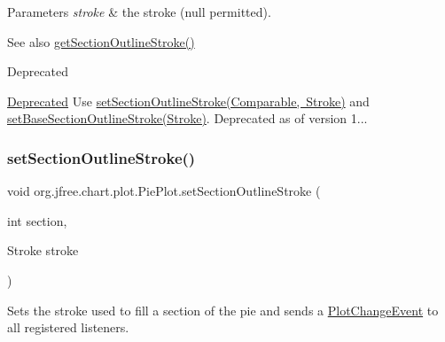 \begin{DoxyParams}{Parameters}
{\em stroke} & the stroke ({\ttfamily null} permitted).\\
\hline
\end{DoxyParams}
\begin{DoxySeeAlso}{See also}
\mbox{\hyperlink{classorg_1_1jfree_1_1chart_1_1plot_1_1_pie_plot_a60e2103a7ab26844fe2b655fc713128b}{get\+Section\+Outline\+Stroke()}}
\end{DoxySeeAlso}
\begin{DoxyRefDesc}{Deprecated}
\item[\mbox{\hyperlink{deprecated__deprecated000075}{Deprecated}}]Use \mbox{\hyperlink{classorg_1_1jfree_1_1chart_1_1plot_1_1_pie_plot_acd082f96925c46a66807857e4314b9ae}{set\+Section\+Outline\+Stroke(\+Comparable, Stroke)}} and \mbox{\hyperlink{classorg_1_1jfree_1_1chart_1_1plot_1_1_pie_plot_a79ef0ad7ef5443afe7f8834c07f10839}{set\+Base\+Section\+Outline\+Stroke(\+Stroke)}}. Deprecated as of version 1... \end{DoxyRefDesc}
\mbox{\label{classorg_1_1jfree_1_1chart_1_1plot_1_1_pie_plot_a4533b2b8fa1d1b27c22b89af74204756}} 
\subsubsection{\texorpdfstring{set\+Section\+Outline\+Stroke()}{setSectionOutlineStroke()}\hspace{0.1cm}{\footnotesize\ttfamily [3/3]}}
{\footnotesize\ttfamily void org.\+jfree.\+chart.\+plot.\+Pie\+Plot.\+set\+Section\+Outline\+Stroke (\begin{DoxyParamCaption}\item[{int}]{section,  }\item[{Stroke}]{stroke }\end{DoxyParamCaption})}

Sets the stroke used to fill a section of the pie and sends a \mbox{\hyperlink{}{Plot\+Change\+Event}} to all registered listeners.


